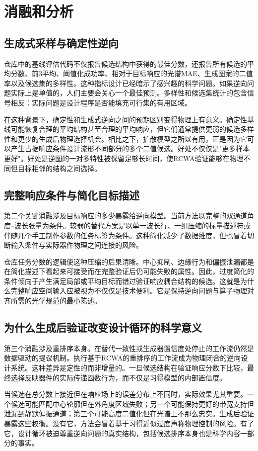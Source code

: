 \section{消融和分析}

\subsection{生成式采样与确定性逆向}

仓库中的基线评估代码不仅报告候选结构中获得的最佳分数，还报告所有候选的平均分数、前3平均、阈值化成功率、相对于目标响应的光谱MAE、生成图案的二值率以及候选集的多样性。这种指标设计已经暗示了感兴趣的科学问题。如果逆向问题实际上是单值的，人们主要会关心一个最佳预测。多样性和候选集统计的包含信号相反：实际问题是设计程序是否能填充可行集的有用区域。

在这种背景下，确定性和生成式逆向之间的预期区别变得物理上有意义。确定性基线可能恢复合理的平均结构甚至合理的平均响应，但它们通常提供更弱的候选多样性和更少的生成后物理选择机会。相比之下，扩散模型之所以有用，正是因为它可以产生占据响应条件设计流形不同部分的多个二值候选。好处不仅仅是"更多样本更好"。好处是逆图的一对多特性被保留足够长时间，使RCWA验证能够在物理不同但目标相邻的结构之间选择。

\subsection{完整响应条件与简化目标描述}

第二个关键消融涉及目标响应的多少暴露给逆向模型。当前方法以完整的双通道角度--波长张量为条件。较弱的替代方案是以单一波长行、一组压缩的标量描述符或伴随几个手工制作参数的任务标签为条件。这种简化减少了数据维度，但也冒着切断输入条件与实际器件物理之间连接的风险。

仓库任务分数的逻辑使这种压缩的后果清晰。中心抑制、边缘行为和偏振泄漏都是在简化描述下看起来可接受而在完整验证后仍可能失败的属性。因此，过度简化的条件倾向于产生满足局部或平均目标而错过验证响应耦合结构的候选。这就是为什么完整响应空间输入应被视为不仅仅是技术便利。它是保持逆向问题与算子物理对齐所需的光学规范的最小陈述。

\subsection{为什么生成后验证改变设计循环的科学意义}

第三个消融涉及重排序本身。在替代一致性或生成器置信度处停止的工作流仍然是数据驱动的提议机制。执行基于RCWA的重排序的工作流成为物理闭合的逆向设计系统。这种差异是定性的而非增量的。一旦候选结构在验证响应分数下比较，最终选择反映器件的实际传递函数行为，而不仅是习得模型的内部置信度。

当候选在总分数上接近但在响应场上的误差分布上不同时，实际效果尤其重要。一个候选可能匹配中心轮廓但在外角度区域失败；另一个可能保持更好的带宽支持但泄漏到静默偏振通道；第三个可能高度二值化但在光谱上不那么忠实。生成后验证暴露这些权衡。没有它，方法会冒着基于习得近似过度声称物理控制的风险。有了它，设计循环被迫尊重逆向问题的真实结构，包括候选排序本身也是科学内容一部分的事实。
